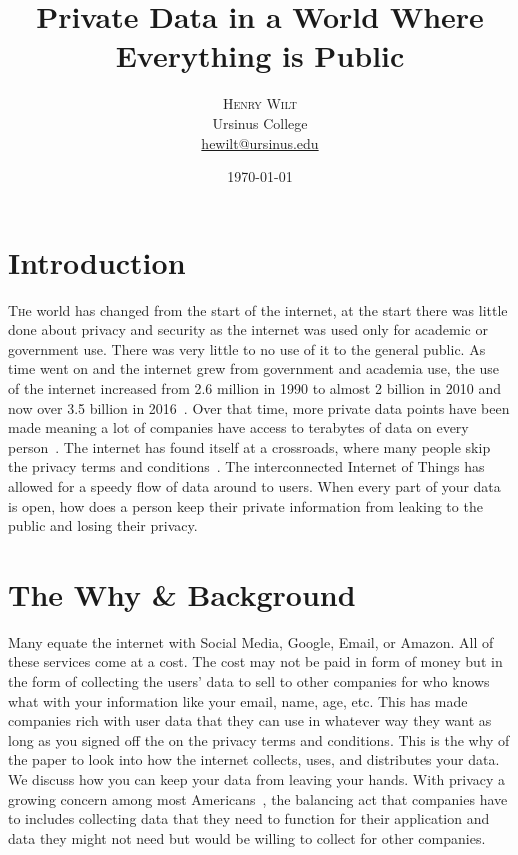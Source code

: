 \documentclass[10.5pt, twoside,twocolumn]{article}
\title{Private Data in a World Where Everything is Public} %
\author{%
\textsc{Henry Wilt} \\[1ex]%
\normalsize Ursinus College \\ %
\normalsize \href{mailto:hewilt@ursinus.edu}{hewilt@ursinus.edu} %
}
\date{\today} %
\begin{document}
\maketitle

\section{Introduction}

\lettrine[nindent=0em,lines=2]{T}he world has changed from the start of the internet, at the start there was little done about privacy and security as the internet was used only for academic or government use. There was very little to no use of it to the general public. As time went on and the internet grew from government and academia use, the use of the internet increased from 2.6 million in 1990 to almost 2 billion in 2010 and now over 3.5 billion in 2016~\cite{owidinternet}. Over that time, more private data points have been made meaning a lot of companies have access to terabytes of data on every person~\cite{data_person}. The internet has found itself at a crossroads, where many people skip the privacy terms and conditions~\cite{auxier_rainie_anderson_perrin_kumar_turner_2020}. The interconnected Internet of Things has allowed for a speedy flow of data around to users. When every part of your data is open, how does a person keep their private information from leaking to the public and losing their privacy. 


\section{The Why \& Background}
Many equate the internet with Social Media, Google, Email, or Amazon. All of these services come at a cost. The cost may not be paid in form of money but in the form of collecting the users' data to sell to other companies for who knows what with your information like your email, name, age, etc. This has made companies rich with user data that they can use in whatever way they want as long as you signed off the on the privacy terms and conditions. This is the why of the paper to look into how the internet collects, uses, and distributes your data. We discuss how you can keep your data from leaving your hands. With privacy a growing concern among most Americans~\cite{auxier_rainie_anderson_perrin_kumar_turner_2020}, the balancing act that companies have to includes collecting data that they need to function for their application and data they might not need but would be willing to collect for other companies.
\end{document}
